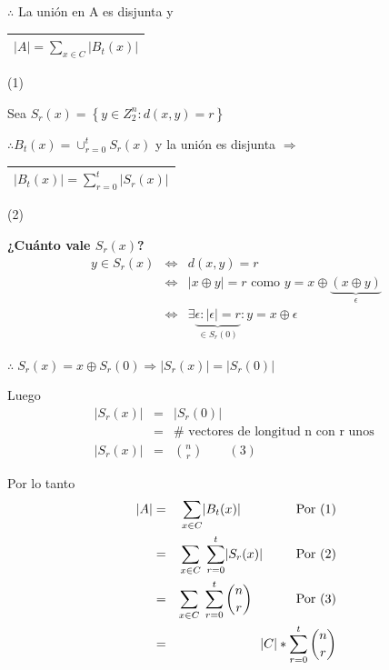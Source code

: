\documentclass[12pt,a4paper]{report}
\begin{document}
  			\begin{center}
  				$\therefore$ La unión en A es disjunta y \begin{tabular}{|c|} \hline $ \lvert A \rvert = \sum_{x \in C} \lvert B_{t}(x) \rvert $ \\ \hline \end{tabular} (1)
  			\end{center}

  			\vspace{3mm}
  			\par Sea $S_{r}(x) = \left\lbrace y \in Z_{2}^{n} : d(x, y) = r \right\rbrace$

  			\vspace{3mm}
  			\par $\therefore B_{t}(x) = \cup_{r = 0}^{t}S_{r}(x)$ y la unión es disjunta $\Rightarrow$ \begin{tabular}{|c|} \hline $ \lvert B_{t}(x) \rvert = \sum_{r = 0}^{t}\lvert S_{r}(x) \rvert$ \\ \hline \end{tabular} (2)

  			\vspace{3mm}
  			\textbf{¿Cuánto vale $S_{r}(x)$?}
  			\begin{eqnarray}
  				\nonumber y \in S_{r}(x) & \Leftrightarrow & d(x, y) = r \\
  				\nonumber & \Leftrightarrow & \lvert x \oplus y \rvert = r \text{ como } y = x \oplus \underbrace{(x \oplus y)}_{\epsilon} \\
  				\nonumber & \Leftrightarrow & \exists \underbrace{\epsilon : \lvert \epsilon\rvert = r}_{\in S_{r}(0)} : y = x \oplus \epsilon
  			\end{eqnarray}
  			\par $\therefore \; S_{r}(x) = x \oplus S_{r}(0) \Rightarrow \lvert S_{r}(x)\rvert = \lvert S_{r}(0)\rvert $

  			\vspace{3mm}
  			\par Luego
  			\begin{eqnarray}
  				\nonumber \lvert S_{r}(x)\rvert &=& \lvert S_{r}(0)\rvert \\
  				\nonumber &=& \# \text{ vectores de longitud n con r unos } \\
  				\nonumber \lvert S_{r}(x)\rvert &=& {n \choose r} \qquad (3)
  			\end{eqnarray}

  			\par Por lo tanto
  			\begin{eqnarray}
  				\nonumber \lvert A\rvert &=& \sum_{x \in C} \lvert B_{t}(x)\rvert \qquad \qquad \textup{ Por (1)} \\
  				\nonumber &=& \sum_{x \in C} \; \sum_{r= 0}^{t} \lvert S_{r}(x) \rvert \; \qquad \textup{ Por (2)} \\
  				\nonumber &=& \sum_{x \in C} \; \sum_{r = 0}^{t} {n \choose r} \qquad \; \; \; \;\textup{ Por (3)} \\
  				\nonumber &=& \lvert C \rvert * \sum_{r = 0}^{t} {n \choose r}
  			\end{eqnarray}
\end{document}
